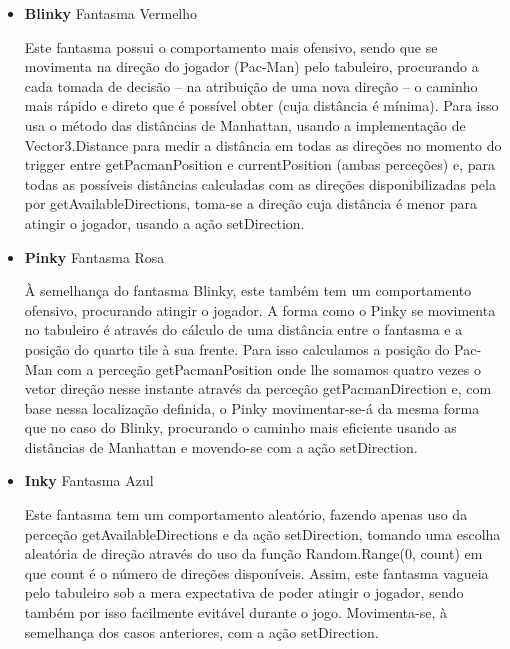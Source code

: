 \documentclass{article}
\begin{document}
\begin{itemize}
    \item \textbf{Blinky} {Fantasma Vermelho}
    
    Este fantasma possui o comportamento mais ofensivo, sendo que se
movimenta na direção do jogador (Pac-Man) pelo tabuleiro, procurando a cada
tomada de decisão – na atribuição de uma nova direção – o caminho mais rápido e
direto que é possível obter (cuja distância é mínima). Para isso usa o método das
distâncias de Manhattan, usando a implementação de Vector3.Distance para
medir a distância em todas as direções no momento do trigger entre
getPacmanPosition e currentPosition (ambas perceções) e, para todas as
possíveis distâncias calculadas com as direções disponibilizadas pela por
getAvailableDirections, toma-se a direção cuja distância é menor para atingir
o jogador, usando a ação setDirection.
\end{itemize}

\begin{itemize}
    \item \textbf{Pinky} {Fantasma Rosa}
    
    À semelhança do fantasma Blinky, este também tem um comportamento
ofensivo, procurando atingir o jogador. A forma como o Pinky se movimenta no
tabuleiro é através do cálculo de uma distância entre o fantasma e a posição do
quarto tile à sua frente. Para isso calculamos a posição do Pac-Man com a perceção
getPacmanPosition onde lhe somamos quatro vezes o vetor direção nesse
instante através da perceção getPacmanDirection e, com base nessa localização
definida, o Pinky movimentar-se-á da mesma forma que no caso do Blinky,
procurando o caminho mais eficiente usando as distâncias de Manhattan e
movendo-se com a ação setDirection.
\end{itemize}

\begin{itemize}
    \item \textbf{Inky} {Fantasma Azul}
    
    Este fantasma tem um comportamento aleatório, fazendo apenas uso da
perceção getAvailableDirections e da ação setDirection, tomando uma
escolha aleatória de direção através do uso da função Random.Range(0, count)
em que count é o número de direções disponíveis. Assim, este fantasma vagueia
pelo tabuleiro sob a mera expectativa de poder atingir o jogador, sendo também por
isso facilmente evitável durante o jogo. Movimenta-se, à semelhança dos casos
anteriores, com a ação setDirection.
\end{itemize}
\end{document}
